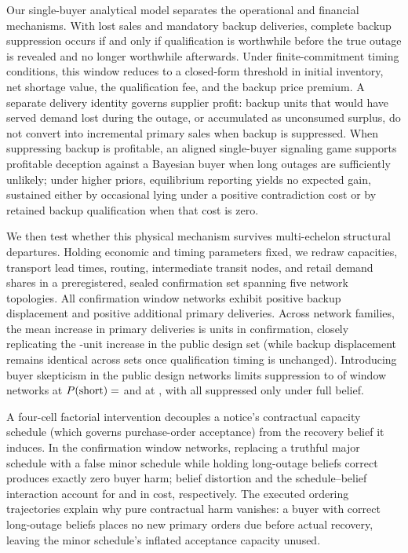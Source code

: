 \documentclass[preprint,11pt,authoryear]{elsarticle}
\newcommand{\claim}[1]{} %
\begin{document}
\claim{I5}Our single-buyer analytical model separates the operational and financial mechanisms. With lost sales and mandatory backup deliveries, complete backup suppression occurs if and only if qualification is worthwhile before the true outage is revealed and no longer worthwhile afterwards. Under finite-commitment timing conditions, this window reduces to a closed-form threshold in initial inventory, net shortage value, the qualification fee, and the backup price premium. A separate delivery identity governs supplier profit: backup units that would have served demand lost during the outage, or accumulated as unconsumed surplus, do not convert into incremental primary sales when backup is suppressed. When suppressing backup is profitable, an aligned single-buyer signaling game supports profitable deception against a Bayesian buyer when long outages are sufficiently unlikely; under higher priors, equilibrium reporting yields no expected gain, sustained either by occasional lying under a positive contradiction cost or by retained backup qualification when that cost is zero.

\claim{I6}We then test whether this physical mechanism survives multi-echelon structural departures. Holding economic and timing parameters fixed, we redraw capacities, transport lead times, routing, intermediate transit nodes, and retail demand shares in a preregistered, sealed confirmation set spanning five network topologies. All  confirmation window networks exhibit positive backup displacement and positive additional primary deliveries. Across network families, the mean increase in primary deliveries is  units in confirmation, closely replicating the -unit increase in the public design set (while backup displacement remains identical across sets once qualification timing is unchanged). Introducing buyer skepticism in the public design networks limits suppression to  of  window networks at $P(\mathrm{short})=\db{alpha2}$ and  at , with all  suppressed only under full belief.

\claim{I7}A four-cell factorial intervention decouples a notice's contractual capacity schedule (which governs purchase-order acceptance) from the recovery belief it induces. In the confirmation window networks, replacing a truthful major schedule with a false minor schedule while holding long-outage beliefs correct produces exactly zero buyer harm; belief distortion and the schedule--belief interaction account for  and  in cost, respectively. The executed ordering trajectories explain why pure contractual harm vanishes: a buyer with correct long-outage beliefs places no new primary orders due before actual recovery, leaving the minor schedule's inflated acceptance capacity unused.
\end{document}

